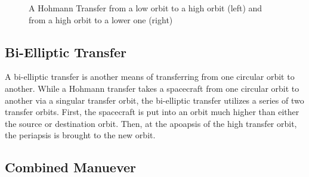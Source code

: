 \documentclass{article}
\begin{document}
\begin{figure}[H]
    \centering
    \def\Rone{0.75}
    \def\Rtwo{2.5}
    \def\transSMA{\fpeval{2*\rTwo}}
    \def\ctrX{\fpeval{\Rone-\transSMA}}
    \def\trE{\fpeval{\Rtwo/\transSMA - 1}}
    \def\transSmA{\fpeval{\transSMA*sqrt(1-(\trE)^2)}}
    \def\dV{1.25}
    \caption{A Hohmann Transfer from a low orbit to a high orbit (left) and from a high orbit to a lower one (right)}\label{fig:Expedited Transfer}
\end{figure}



\bigskip\bigskip
\subsection{Bi-Elliptic Transfer}

A bi-elliptic transfer is another means of transferring from one circular orbit to another. While a Hohmann transfer takes a spacecraft from one circular orbit to another via a singular transfer orbit, the bi-elliptic transfer utilizes a series of two transfer orbits. First, the spacecraft is put into an orbit much higher than either the source or destination orbit. Then, at the apoapsis of the high transfer orbit, the periapsis is brought to the new orbit.


\bigskip\bigskip
\subsection{Combined Manuever}
\end{document}
